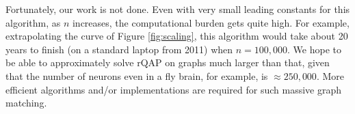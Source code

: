 \documentclass[10pt,journal,cspaper,compsoc]{IEEEtran}
\begin{document}
Fortunately, our work is not done. Even with very small leading constants for this algorithm, as $n$ increases, the computational burden gets quite high.  For example, extrapolating the curve of Figure \ref{fig:scaling}, this algorithm would take about 20 years to finish (on a standard laptop from 2011) when $n=100,000$.  We hope to be able to approximately solve rQAP on graphs much larger than that, given that the number of neurons even in a fly brain, for example, is $\approx 250,000$.  More efficient algorithms and/or implementations are required for such massive graph matching. 


\end{document}
